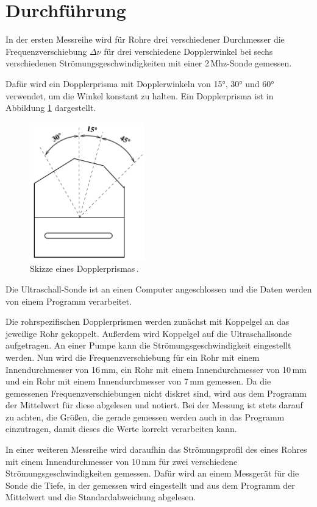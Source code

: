\section{Durchführung}
\label{sec:Durchführung}

In der ersten Messreihe wird für Rohre drei verschiedener Durchmesser die
Frequenzverschiebung $\Delta \nu$ für drei verschiedene Dopplerwinkel
bei sechs verschiedenen Strömungsgeschwindigkeiten mit einer 2\,Mhz-Sonde gemessen.

Dafür wird ein Dopplerprisma mit Dopplerwinkeln von 15°, 30° und 60° verwendet,
um die Winkel konstant zu halten. Ein Dopplerprisma ist in Abbildung \ref{fig:dopplerprisma}
dargestellt.
\begin{figure}
  \centering
  \includegraphics[width=5cm]{data/dopplerprisma.png}
  \caption{Skizze eines Dopplerprismas\,\cite{Versuchsanleitung}.}
  \label{fig:dopplerprisma}
\end{figure}
Die Ultraschall-Sonde ist an einen Computer angeschlossen und die Daten werden
von einem Programm verarbeitet.

Die rohrspezifischen Dopplerprismen werden zunächst mit Koppelgel an das jeweilige
Rohr gekoppelt. Außerdem wird Koppelgel auf die Ultraschallsonde aufgetragen.
An einer Pumpe kann die Strömungsgeschwindigkeit eingestellt werden. Nun wird
die Frequenzverschiebung für ein
Rohr mit einem Innendurchmesser von 16\,mm, ein Rohr mit einem Innendurchmesser von
10\,mm und ein Rohr mit einem Innendurchmesser von 7\,mm gemessen. Da die gemessenen
Frequenzverschiebungen nicht diskret sind, wird aus dem Programm der Mittelwert
für diese abgelesen und notiert. Bei der Messung ist stets darauf zu achten, die
Größen, die gerade gemessen werden auch in das Programm einzutragen, damit dieses
die Werte korrekt verarbeiten kann.

In einer weiteren Messreihe wird daraufhin das Strömungsprofil des eines Rohres mit
einem Innendurchmesser von 10\,mm für zwei verschiedene Strömungsgeschwindigkeiten
gemessen. Dafür wird an einem Messgerät für die Sonde die Tiefe, in der gemessen wird
eingestellt und aus dem Programm der Mittelwert und die Standardabweichung abgelesen.
